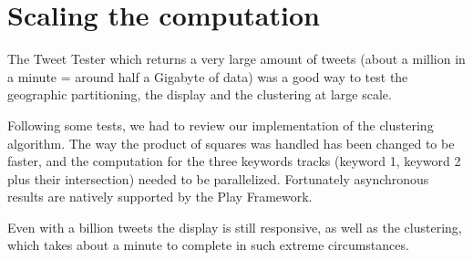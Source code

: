 \section{Scaling the computation}

The Tweet Tester which returns a very large amount of tweets (about a million in a minute = around half a Gigabyte of data) was a good way to test the geographic partitioning, the display and the clustering at large scale.

Following some tests, we had to review our implementation of the clustering algorithm. The way the product of squares was handled has been changed to be faster, and the computation for the three keywords tracks (keyword 1, keyword 2 plus their intersection) needed to be parallelized. Fortunately asynchronous results are natively supported by the Play Framework.

Even with a billion tweets the display is still responsive, as well as the clustering, which takes about a minute to complete in such extreme circumstances.
